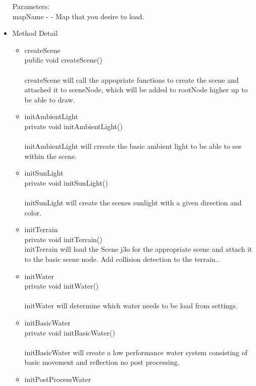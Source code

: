 \documentclass[letterpaper]{article}
\begin{document}
\begin{itemize}
										Parameters: \\
										mapName - - Map that you desire to load.
								\item	Method Detail
										\begin{itemize}
											\item	createScene \\
													public void createScene() \\ \\
													createScene will call the appopriate functions to create the scene and attached it to sceneNode, which will be added to rootNode higher up to be able to draw. \\
											\item	initAmbientLight \\
													private void initAmbientLight() \\ \\
													initAmbientLight will crreate the basic ambient light to be able to see within the scene. \\
											\item	initSunLight \\
													private void initSunLight() \\ \\
													initSunLight will create the scenes sunlight with a given direction and color.
											\item	initTerrain \\
													private void initTerrain() \\
													initTerrain will load the Scene j3o for the appropriate scene and attach it to the basic scene node. Add collision detection to the terrain.. \\
											\item	initWater \\
													private void initWater() \\ \\
													initWater will determine which water needs to be load from settings.
											\item	initBasicWater \\
													private void initBasicWater() \\ \\
													initBasicWater will create a low performance water system consisting of basic movement and reflection no post processing. \\
											\item	initPostProcessWater \\

\end{itemize}
\end{itemize}
\end{document}
